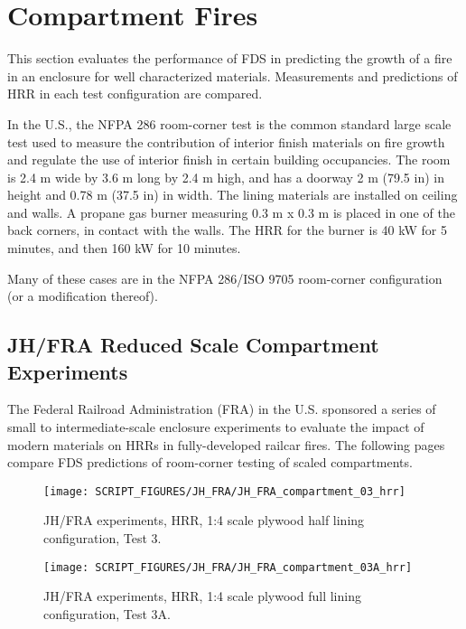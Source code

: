 \clearpage

\section{Compartment Fires}\label{sec_Compartment_Fires}

This section evaluates the performance of FDS in predicting the growth of a fire in an enclosure for well characterized materials.
Measurements and predictions of HRR in each test configuration are compared.

In the U.S., the NFPA 286 room-corner test is the common standard large scale test used to measure the contribution of interior finish materials on fire growth and regulate the use of interior finish in certain building occupancies.
The room is 2.4 m wide by 3.6 m long by 2.4 m high, and has a doorway 2 m (79.5 in) in height and 0.78 m (37.5 in) in width.
The lining materials are installed on ceiling and walls. A propane gas burner measuring 0.3 m x 0.3 m is placed in one of the back corners, in contact with the walls.
The HRR for the burner is 40 kW for 5 minutes, and then 160 kW for 10 minutes.

Many of these cases are in the NFPA 286/ISO 9705 room-corner configuration (or a modification thereof).

\subsection{JH/FRA Reduced Scale Compartment Experiments}\label{sec_JH_FRA_Scaled_Compartments}

The Federal Railroad Administration (FRA) in the U.S. sponsored a series of small to intermediate-scale enclosure experiments to evaluate the impact of modern materials on HRRs in fully-developed railcar fires.
The following pages compare FDS predictions of room-corner testing of scaled compartments.

\begin{figure}[h!]
\centering
\texttt{[image: SCRIPT\_FIGURES/JH\_FRA/JH\_FRA\_compartment\_03\_hrr]}
\caption[JH/FRA experiments, HRR, 1:4 scale plywood half lining configuration, Test 3]{JH/FRA experiments, HRR, 1:4 scale plywood half lining configuration, Test 3.}
\label{JH_FRA_plywood_01}
\end{figure}

\begin{figure}[h!]
\centering
\texttt{[image: SCRIPT\_FIGURES/JH\_FRA/JH\_FRA\_compartment\_03A\_hrr]}
\caption[JH/FRA experiments, HRR, 1:4 scale plywood full lining configuration, Test 3A]{JH/FRA experiments, HRR, 1:4 scale plywood full lining configuration, Test 3A.}
\label{JH_FRA_plywood_01A}
\end{figure}

